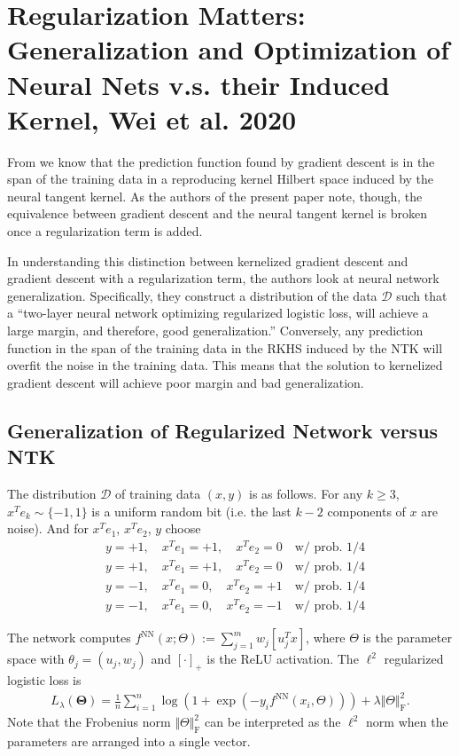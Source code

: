\documentclass{article}
\begin{document}
\section{Regularization Matters: Generalization and Optimization of
Neural Nets v.s. their Induced Kernel, Wei et al. 2020}

From \cite{jacot2018neural} we know that the prediction function found by gradient descent is in the span of the training data in a reproducing kernel Hilbert space induced by the neural tangent kernel. As the authors of the present paper note, though, the equivalence between gradient descent and the neural tangent kernel is broken once a regularization term is added. 

In understanding this distinction between kernelized gradient descent and gradient descent with a regularization term, the authors look at neural network generalization. Specifically, they construct a distribution of the data $\mathcal{D}$ such that a \enquote{two-layer neural network optimizing regularized logistic loss, will achieve a large margin, and therefore, good generalization.} Conversely, any prediction function in the span of the training data in the RKHS induced by the NTK will overfit the noise in the training data. This means that the solution to kernelized gradient descent will achieve poor margin and bad generalization.

\subsection{Generalization of Regularized Network versus NTK}

The distribution $\mathcal{D}$ of training data $(x,y)$ is as follows. For any $k \geq 3$, $x^Te_k \sim \{-1,1\}$ is a uniform random bit (i.e. the last $k-2$ components of $x$ are noise). And for $x^Te_1$, $x^Te_2$, $y$ choose
\begin{align*}
    &y = +1, \quad x^Te_1 = +1, \quad x^Te_2 = 0 \quad \text{w/ prob. 1/4}\\
    &y = +1, \quad x^Te_1 = +1, \quad x^Te_2 = 0 \quad \text{w/ prob. 1/4}\\
    &y = -1, \quad x^Te_1 = 0, \quad x^Te_2 = +1 \quad \text{w/ prob. 1/4}\\
    &y = -1, \quad x^Te_1 = 0, \quad x^Te_2 = -1 \quad \text{w/ prob. 1/4}
\end{align*}

The network computes $f^{\text{NN}}(x; \Theta) := \sum_{j=1}^m w_j [u_j^Tx]$, where $\Theta$ is the parameter space with $\theta_j = (u_j, w_j)$ and  $[\cdot]_+$ is the ReLU activation. The $\ell^2$ regularized logistic loss is 
\begin{align*}
    L_{\lambda}(\boldsymbol{\Theta}) = \frac{1}{n} \sum_{i=1}^n \log(1 + \exp(-y_i f^{\text{NN}}(x_i, \Theta))) + \lambda \Vert \Theta \Vert_{\text{F}}^2.
\end{align*}
Note that the Frobenius norm $\Vert \Theta \Vert_{\text{F}}^2$ can be interpreted as the $\ell^2$ norm when the parameters are arranged into a single vector.
\end{document}
